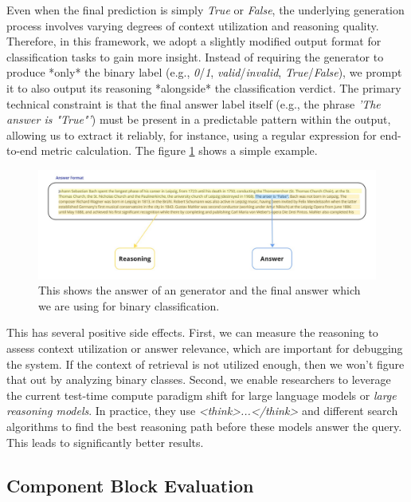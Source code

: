 Even when the final prediction is simply \textit{True} or \textit{False}, the underlying generation process involves varying degrees of context utilization and reasoning quality. Therefore, in this framework, we adopt a slightly modified output format for classification tasks to gain more insight. Instead of requiring the generator to produce *only* the binary label (e.g., \textit{0}/\textit{1}, \textit{valid}/\textit{invalid}, \textit{True}/\textit{False}), we prompt it to also output its reasoning *alongside* the classification verdict. The primary technical constraint is that the final answer label itself (e.g., the phrase \textit{'The answer is "True"'}) must be present in a predictable pattern within the output, allowing us to extract it reliably, for instance, using a regular expression for end-to-end metric calculation. The figure \ref{fig:answerreason} shows a simple example.

\begin{figure}
  \centering
  \includegraphics[width=\textwidth]{images/Answer-vs-Reasoning.pdf}
  \caption{This shows the answer of an generator and the final answer which we are using for binary classification.}
  \label{fig:answerreason}
\end{figure}

This has several positive side effects. First, we can measure the reasoning to assess context utilization or answer relevance, which are important for debugging the system. If the context of retrieval is not utilized enough, then we won't figure that out by analyzing binary classes. Second, we enable researchers to leverage the current test-time compute paradigm shift for large language models or \textit{large reasoning models}. In practice, they use \textit{<think>...</think>} and different search algorithms to find the best reasoning path before these models answer the query. This leads to significantly better results.\cite{Xu.16.01.2025}


\subsection{Component Block Evaluation}

